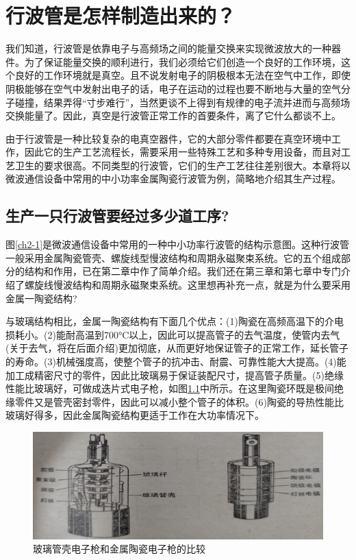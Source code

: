 \chapter{行波管是怎样制造出来的？}
我们知道，行波管是依靠电子与高频场之间的能量交换来实现微波放大的一种器件。为了保证能量交换的顺利进行，我们必须给它们创造一个良好的工作环境，这个良好的工作环境就是真空。且不说发射电子的阴极根本无法在空气中工作，即使阴极能够在空气中发射出电子的话，电子在运动的过程也要不断地与大量的空气分子碰撞，结果弄得“寸步难行”，当然更谈不上得到有规律的电子流并进而与高频场交换能量了。因此，真空是行波管正常工作的首要条件，离了它什么都谈不上。


由于行波管是一种比较复杂的电真空器件，它的大部分零件都要在真空环境中工作，因此它的生产工艺流程长，需要采用一些特殊工艺和多种专用设备，而且对工艺卫生的要求很高。不同类型的行波管，它们的生产工艺往往差别很大。本章将以微波通信设备中常用的中小功率金属陶瓷行波管为例，简略地介绍其生产过程。

\section{生产一只行波管要经过多少道工序?}

图\ref{ch2-1}是微波通信设备中常用的一种中小功率行波管的结构示意图。这种行波管一般采用金属陶瓷管壳、螺旋线型慢波结构和周期永磁聚束系统。它的五个组成部分的结构和作用，已在第二章中作了简单介绍。我们还在第三章和第七章中专门介绍了螺旋线慢波结构和周期永磁聚束系统。这里想再补充一点，就是为什么要采用金属一陶瓷结构?


与玻璃结构相比，金属一陶瓷结构有下面几个优点：(1)陶瓷在高频高温下的介电损耗小。(2)能耐高温到700°C以上，因此可以提高管子的去气温度，使管内去气(关于去气，将在后面介绍)更加彻底，从而更好地保证管子的正常工作，延长管子的寿命。(3)机械强度高，使整个管子的抗冲击、耐震、可靠性能大大提高。(4)能加工成精密尺寸的零件，因此比玻璃易于保证装配尺寸，提高管子质量。(5)绝缘性能比玻璃好，可做成迭片式电子枪，如图\ref{ch10-1}中所示。在这里陶瓷环既是极间绝缘零件又是管壳密封零件，因此可以减小整个管子的体积。(6)陶瓷的导热性能比玻璃好得多，因此金属陶瓷结构更适于工作在大功率情况下。
\begin{figure}[phtb]
	\centering
	\includegraphics[width=0.8\linewidth]{figure/ch10-1}
	\caption{ 玻璃管壳电子枪和金属陶瓷电子枪的比较}
	\label{ch10-1}
\end{figure}


